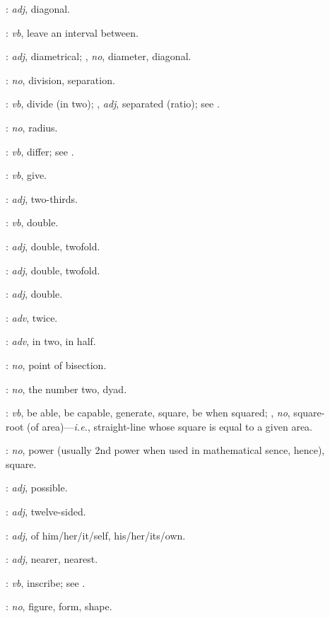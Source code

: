 {\begin{description}
\item[]: {\em adj}, diagonal.
\item[]: {\em vb}, leave an interval between.
\item[]: {\em adj}, diametrical; , {\em no}, diameter, diagonal.
\item[]: {\em no}, division, separation.
\item[]: {\em vb}, divide (in two); , {\em adj}, separated (ratio); see .
\item[]: {\em no}, radius.
\item[]: {\em vb}, differ; see .
\item[]:
{\em vb}, give.
\item[]: {\em adj}, two-thirds.
\item[]: {\em vb}, double.
\item[]: {\em adj}, double, twofold.
\item[]: {\em adj}, double, twofold.
\item[]: {\em adj}, double.
\item[]: {\em adv}, twice.
\item[]: {\em adv}, in two, in half.
\item[]: {\em no}, point of bisection.
\item[]: {\em no}, the number two, dyad.
\item[]: {\em vb}, be able, be capable, generate, square, be when squared; , {\em no}, 
square-root (of area)---{\em i.e.}, strai\-ght-line whose square is equal to a given area.
\item[]: {\em no}, power (usually 2nd power when used in mathematical sence, hence), square.
\item[]: {\em adj}, possible.
\item[]: {\em adj}, twelve-sided.
\item[]: {\em adj}, of him/her/it/self, his/her/its/own.
\item[]: {\em adj}, nearer, nearest.
\item[]: {\em vb}, inscribe; see .
\item[]: {\em no}, figure, form, shape.

\end{description}}
